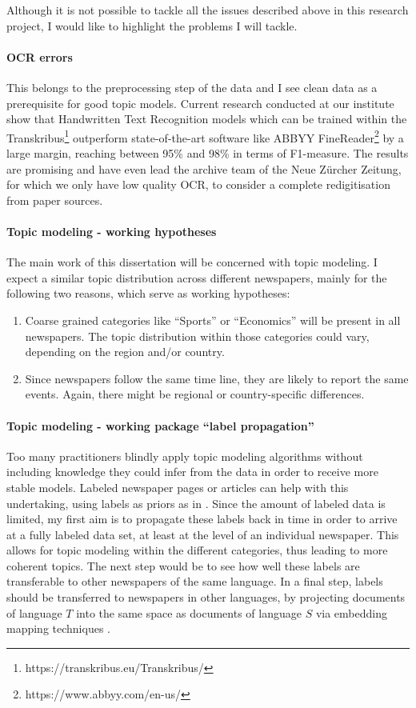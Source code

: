 Although it is not possible to tackle all the issues described above in this research project, I would like to highlight the problems I will tackle.

\paragraph{OCR errors} This belongs to the preprocessing step of the data and I see clean data as a prerequisite for good topic models. Current research conducted at our institute show that Handwritten Text Recognition models which can be trained within the Transkribus\footnote{https://transkribus.eu/Transkribus/} outperform state-of-the-art software like ABBYY FineReader\footnote{https://www.abbyy.com/en-us/} by a large margin, reaching between 95\%  and 98\% in terms of F1-measure. The results are promising and have even lead the archive team of the Neue Zürcher Zeitung, for which we only have low quality OCR, to consider a complete redigitisation from paper sources.

\paragraph{Topic modeling - working hypotheses} The main work of this dissertation will be concerned with topic modeling. I expect a similar topic distribution across different newspapers, mainly for the following two reasons, which serve as working hypotheses:

\begin{enumerate}
    \item Coarse grained categories like ``Sports'' or ``Economics'' will be present in all newspapers. The topic distribution within those categories could vary, depending on the region and/or country.
    \item Since newspapers follow the same time line, they are likely to report the same events. Again, there might be regional or country-specific differences. 
\end{enumerate}

\paragraph{Topic modeling - working package ``label propagation''} Too many practitioners blindly apply topic modeling algorithms without including knowledge they could infer from the data in order to receive more stable models. Labeled newspaper pages or articles can help with this undertaking, using labels as priors as in \citet{kang2013}. Since the amount of labeled data is limited, my first aim is to propagate these labels back in time in order to arrive at a fully labeled data set, at least at the level of an individual newspaper. This allows for topic modeling within the different categories, thus leading to more coherent topics. The next step would be to see how well these labels are transferable to other newspapers of the same language. In a final step, labels should be transferred to newspapers in other languages, by projecting documents of language $T$ into the same space as documents of language $S$ via embedding mapping techniques \citet{artetxe2018aaai}.

